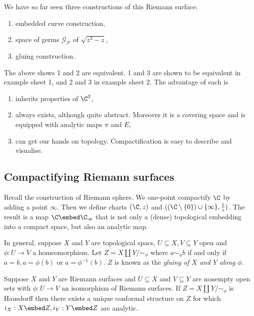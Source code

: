 \documentclass[a4paper]{article}
\begin{document}
We have so far seen three constructions of this Riemann surface:
\begin{enumerate}
\item embedded curve construction,
\item space of germs \(\mathcal G_{\mathcal F}\) of \(\sqrt{z^3 - z}\),
\item gluing construction.
\end{enumerate}
The above shows 1 and 2 are equivalent. 1 and 3 are shown to be equivalent in example sheet 1, and 2 and 3 in example sheet 2. The advantage of each is
\begin{enumerate}
\item inherits properties of \(\C^2\),
\item always exists, although quite abstract. Moreover it is a covering space and is equipped with analytic maps \(\pi\) and \(E\),
\item can get our hands on topology. Compactification is easy to describe and visualise.
\end{enumerate}

\subsection{Compactifying Riemann surfaces}

Recall the construction of Riemann sphere. We one-point compactify \(\C\) by adding a point \(\infty\). Then we define charts \((\C, z)\) and \(((\C\setminus \{0\}) \cup \{\infty\}, \frac{1}{z})\). The result is a map \(\C \embed \C_\infty\) that is not only a (dense) topological embedding into a compact space, but also an analytic map.

In general, suppose \(X\) and \(Y\) are topological spacs, \(U \subseteq X, V \subseteq Y\) open and \(\phi: U \to V\) a homeomorphism. Let \(Z = X \amalg Y / \sim_\phi\) where \(a \sim_\phi b\) if and only if \(a = b, a = \phi(b)\) or \(a = \phi^{-1}(b)\). \(Z\) is known as the \emph{gluing of \(X\) and \(Y\) along \(\phi\)}.

\begin{proposition}
  Suppose \(X\) and \(Y\) are Riemann surfaces and \(U \subseteq X\) and \(V \subseteq Y\) are nonempty open sets with \(\phi: U \to V\) an isomorphism of Riemann surfaces. If \(Z = X \amalg Y / \sim_\phi\) is Hausdorff then there exists a unique conformal structure on \(Z\) for which \(i_X: X \embed Z, i_Y: Y \embed Z\) are analytic.
\end{proposition}
\end{document}
